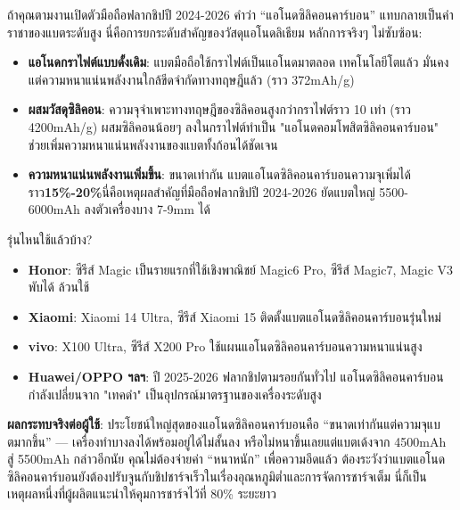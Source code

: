 
ถ้าคุณตามงานเปิดตัวมือถือฟลากชิปปี 2024-2026 คำว่า “แอโนดซิลิคอนคาร์บอน” แทบกลายเป็นคำราชาของแบตระดับสูง นี่คือการยกระดับสำคัญของวัสดุแอโนดลิเธียม หลักการจริงๆ ไม่ซับซ้อน:

\begin{itemize}
  \item \textbf{แอโนดกราไฟต์แบบดั้งเดิม}: แบตมือถือใช้กราไฟต์เป็นแอโนดมาตลอด เทคโนโลยีโตแล้ว มั่นคง แต่ความหนาแน่นพลังงานใกล้ขีดจำกัดทางทฤษฎีแล้ว (ราว 372mAh/g)
  \item \textbf{ผสมวัสดุซิลิคอน}: ความจุจำเพาะทางทฤษฎีของซิลิคอนสูงกว่ากราไฟต์ราว 10 เท่า (ราว 4200mAh/g) ผสมซิลิคอนน้อยๆ ลงในกราไฟต์ทำเป็น "แอโนดคอมโพสิตซิลิคอนคาร์บอน" ช่วยเพิ่มความหนาแน่นพลังงานของแบตทั้งก้อนได้ชัดเจน
  \item \textbf{ความหนาแน่นพลังงานเพิ่มขึ้น}: ขนาดเท่ากัน แบตแอโนดซิลิคอนคาร์บอนความจุเพิ่มได้ราว\textbf{15\%-20\%}นี่คือเหตุผลสำคัญที่มือถือฟลากชิปปี 2024-2026 ยัดแบตใหญ่ 5500-6000mAh ลงตัวเครื่องบาง 7-9mm ได้
\end{itemize}

\begin{tcbinfo}{รุ่นไหนใช้แล้วบ้าง?}
\begin{itemize}
  \item \textbf{Honor}: ซีรีส์ Magic เป็นรายแรกที่ใช้เชิงพาณิชย์ Magic6 Pro, ซีรีส์ Magic7, Magic V3 พับได้ ล้วนใช้
  \item \textbf{Xiaomi}: Xiaomi 14 Ultra, ซีรีส์ Xiaomi 15 ติดตั้งแบตแอโนดซิลิคอนคาร์บอนรุ่นใหม่
  \item \textbf{vivo}: X100 Ultra, ซีรีส์ X200 Pro ใช้แผนแอโนดซิลิคอนคาร์บอนความหนาแน่นสูง
  \item \textbf{Huawei/OPPO ฯลฯ}: ปี 2025-2026 ฟลากชิปตามรอยกันทั่วไป แอโนดซิลิคอนคาร์บอนกำลังเปลี่ยนจาก "เทคดำ" เป็นอุปกรณ์มาตรฐานของเครื่องระดับสูง
\end{itemize}

\end{tcbinfo}

\textbf{ผลกระทบจริงต่อผู้ใช้}: ประโยชน์ใหญ่สุดของแอโนดซิลิคอนคาร์บอนคือ “ขนาดเท่ากันแต่ความจุแบตมากขึ้น” — เครื่องทำบางลงได้พร้อมอยู่ได้ไม่สั้นลง หรือไม่หนาขึ้นเลยแต่แบตเด้งจาก 4500mAh สู่ 5500mAh กล่าวอีกนัย คุณไม่ต้องจ่ายค่า “หนาหนัก” เพื่อความอึดแล้ว ต้องระวังว่าแบตแอโนดซิลิคอนคาร์บอนยังต้องปรับจูนกับชิปชาร์จเร็วในเรื่องอุณหภูมิต่ำและการจัดการชาร์จเต็ม นี่ก็เป็นเหตุผลหนึ่งที่ผู้ผลิตแนะนำให้คุมการชาร์จไว้ที่ 80\% ระยะยาว



